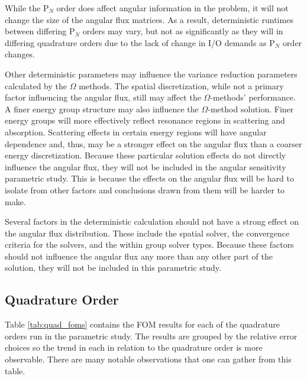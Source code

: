 While the P$_N$ order
does affect angular information in the problem, it will not change the size of
the angular flux matrices. As a result, deterministic runtimes between
differing P$_N$ orders
may vary, but not as significantly as they will in differing quadrature orders
due to the lack of change in I/O demands as P$_N$ order changes.

Other deterministic parameters may influence the variance reduction parameters
calculated by the $\Omega$ methods.
The spatial discretization, while not a primary factor influencing
the angular flux, still may affect the $\Omega$-methods' performance.
A finer energy group structure may also influence the $\Omega$-method solution.
Finer energy groups will more effectively reflect resonance regions in
scattering and absorption. Scattering effects in certain energy regions will
have angular dependence and, thus, may be a stronger effect on the angular flux
than a coarser energy discretization. Because these particular solution effects
do not directly influence the angular flux, they will not be included
in the angular sensitivity parametric study. This is because the effects on the
angular flux will be hard to isolate from other factors and conclusions drawn
from them will be harder to make.


Several factors in the deterministic calculation should not have a strong effect
on the angular flux distribution. These include the spatial solver, the
convergence criteria for the solvers, and the within group solver types.
Because these factors should not influence the angular flux any more than any
other part of the solution, they will not be included in this parametric study.

\subsection{Quadrature Order}
\label{subsec:quadorder}

Table \ref{tab:quad_foms} contains the FOM results for each of the quadrature
orders run in the parametric study. The results are grouped by the relative
error choices so the trend in each in relation to the quadrature order is more
observable. There are many notable observations that one can gather from this
table.

